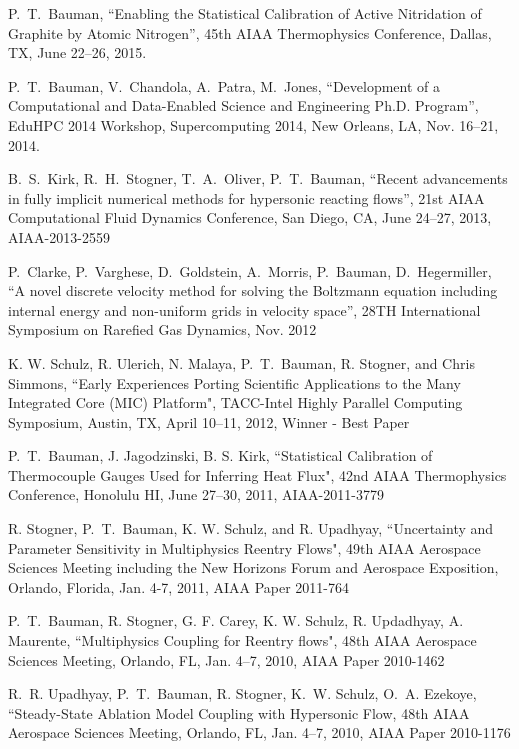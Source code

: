 P.~T.~Bauman, ``Enabling the Statistical Calibration of Active
Nitridation of Graphite by Atomic Nitrogen'',
45th AIAA Thermophysics Conference, Dallas, TX, June 22--26, 2015.

\blankline

P.~T.~Bauman, V.~Chandola, A.~Patra, M.~Jones,
``Development of a Computational and Data-Enabled Science and
Engineering Ph.D. Program'', EduHPC 2014 Workshop, Supercomputing
2014, New Orleans, LA, Nov. 16--21, 2014.

\blankline

B.~S.~Kirk, R.~H.~Stogner, T.~A.~Oliver, P.~T.~Bauman, ``Recent
advancements in fully implicit numerical methods for hypersonic
reacting flows'', 21st AIAA Computational Fluid Dynamics Conference,
San Diego, CA, June 24--27, 2013, AIAA-2013-2559

\blankline

P.~Clarke, P.~Varghese, D.~Goldstein, A.~Morris, P.~Bauman,
D.~Hegermiller, ``A novel discrete velocity method for solving the
Boltzmann equation including internal energy and non-uniform grids in
velocity space'', 28TH International Symposium on Rarefied Gas
Dynamics, Nov. 2012

\blankline

K. W. Schulz,  R. Ulerich,  N. Malaya, P.~T.~Bauman, R. Stogner, and Chris Simmons,
``Early Experiences Porting Scientific Applications to the Many Integrated Core (MIC) Platform",
TACC-Intel Highly Parallel Computing Symposium, Austin, TX,
April 10--11, 2012, Winner - Best Paper

\blankline

P.~T.~Bauman, J. Jagodzinski, B. S. Kirk,
``Statistical Calibration of Thermocouple Gauges Used for Inferring Heat Flux",
42nd AIAA Thermophysics Conference, Honolulu HI, June 27--30, 2011,
AIAA-2011-3779

\blankline

R. Stogner, P.~T.~Bauman, K. W. Schulz, and R. Upadhyay,
``Uncertainty and Parameter Sensitivity in Multiphysics Reentry Flows",
49th AIAA Aerospace Sciences Meeting including the New Horizons Forum and Aerospace Exposition,
Orlando, Florida, Jan. 4-7, 2011, AIAA Paper 2011-764

\blankline

P.~T.~Bauman, R. Stogner, G. F. Carey, K. W. Schulz, R. Updadhyay, A. Maurente,
``Multiphysics Coupling for Reentry flows", 48th AIAA Aerospace Sciences Meeting,
Orlando, FL, Jan. 4--7, 2010, AIAA Paper 2010-1462

\blankline

R.~R. Upadhyay, P.~T.~Bauman, R. Stogner, K.~W. Schulz, O.~A. Ezekoye,
``Steady-State Ablation Model Coupling with Hypersonic Flow, 48th AIAA Aerospace Sciences Meeting,
Orlando, FL, Jan. 4--7, 2010, AIAA Paper 2010-1176
